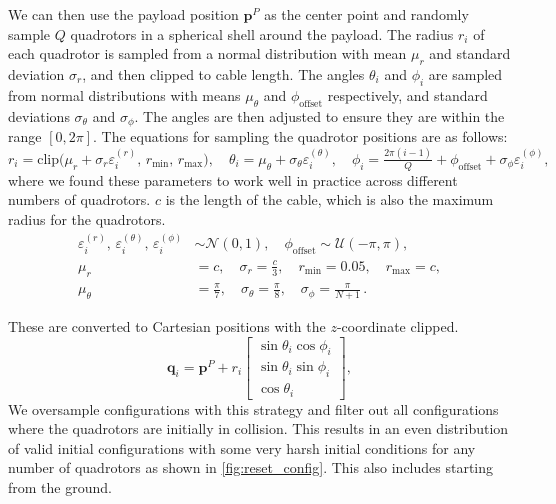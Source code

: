 We can then use the payload position $\mathbf{p}^P$ as the center point and randomly sample $Q$ quadrotors in a spherical shell around the payload. The radius $r_i$ of each quadrotor is sampled from a normal distribution with mean $\mu_r$ and standard deviation $\sigma_r$, and then clipped to cable length. The angles $\theta_i$ and $\phi_i$ are sampled from normal distributions with means $\mu_\theta$ and $\phi_{\mathrm{offset}}$ respectively, and standard deviations $\sigma_\theta$ and $\sigma_\phi$. The angles are then adjusted to ensure they are within the range $[0, 2\pi]$. The equations for sampling the quadrotor positions are as follows:
\begin{equation}
r_i = \mathrm{clip}\bigl(\mu_r+\sigma_r\varepsilon_i^{(r)},\,r_{\min},\,r_{\max}\bigr),\quad
\theta_i = \mu_\theta+\sigma_\theta\varepsilon_i^{(\theta)},\quad
\phi_i = \tfrac{2\pi(i-1)}{Q} + \phi_{\mathrm{offset}} + \sigma_\phi\varepsilon_i^{(\phi)},
\end{equation}
where we found these parameters to work well in practice across different numbers of quadrotors. $c$ is the length of the cable, which is also the maximum radius for the quadrotors.
\begin{equation}
\begin{aligned}
\varepsilon_i^{(r)},\,\varepsilon_i^{(\theta)},\,\varepsilon_i^{(\phi)}
    &\sim \mathcal{N}(0,1), \quad
\phi_{\mathrm{offset}} \sim \mathcal{U}(-\pi,\pi),\\
\mu_r &= c,\quad
\sigma_r = \tfrac{c}{3},\quad
r_{\min} = 0.05,\quad
r_{\max} = c,\\
\mu_\theta &= \tfrac{\pi}{7},\quad
\sigma_\theta = \tfrac{\pi}{8},\quad
\sigma_\phi = \tfrac{\pi}{N+1}\,.
\end{aligned}
\end{equation}

These are converted to Cartesian positions with the $z$-coordinate clipped.
\begin{equation}
\mathbf{q}_i = \mathbf{p}^P + r_i
\begin{bmatrix}
\sin\theta_i\cos\phi_i\\
\sin\theta_i\sin\phi_i\\
\cos\theta_i
\end{bmatrix},
\end{equation}
We oversample configurations with this strategy and filter out all configurations where the quadrotors are initially in collision. This results in an even distribution of valid initial configurations with some very harsh initial conditions for any number of quadrotors as shown in \autoref{fig:reset_config}. This also includes starting from the ground. 

